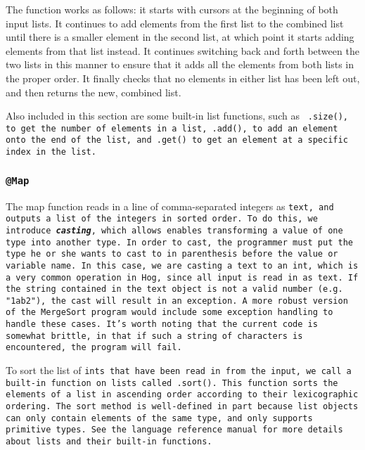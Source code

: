 \documentclass{article} \usepackage{fancyhdr, multicol}
\begin{document}
The function works as follows: it starts with cursors at the beginning of both
input lists. It continues to add elements from the first list to the combined list
until there is a smaller element in the second list, at which point it starts
adding elements from that list instead. It continues switching back and forth
between the two lists in this manner to ensure that it adds all the elements from
both lists in the proper order. It finally checks that no elements in either list
has been left out, and then returns the new, combined list.

Also included in this section are some built-in list functions, such as \tt
.size()\rm, to get the number of elements in a list, \tt .add()\rm, to add an
element onto the end of the list, and \tt .get() \rm to get an element at a
specific index in the list.

\subsubsection*{\tt @Map \rm} 

The map function reads in a line of comma-separated integers as \tt text\rm, and
outputs a list of the integers in sorted order. To do this, we introduce
\textbf{\emph{casting}}, which allows enables transforming a value of one type into
another type. In order to cast, the programmer must put the type he or she wants to
cast to in parenthesis before the value or variable name. In this case, we are
casting a \tt text \rm to an \tt int\rm, which is a very common operation in Hog,
since all input is read in as \tt text\rm. If the string contained in the \tt text
\rm object is not a valid number (e.g. \tt "1ab2"\rm), the cast will result in an
exception. A more robust version of the MergeSort program would include some
exception handling to handle these cases. It's worth noting that the current code
is somewhat brittle, in that if such a string of characters is encountered, the
program will fail.

To sort the list of \tt int\rm s that have been read in from the input, we call a
built-in function on lists called \tt.sort()\rm. This function sorts the elements
of a \tt list \rm in ascending order according to their lexicographic ordering. The
\tt sort \rm method is well-defined in part because \tt list \rm objects can only
contain elements of the same type, and only supports primitive types. See the
language reference manual for more details about \tt lists \rm and their built-in
functions.
\end{document}
